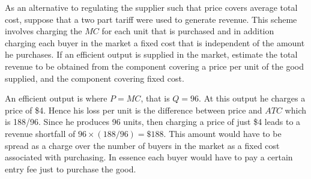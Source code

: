 \begin{enumialphparenastyle}
\begin{ex}\label{ex:ch14ex5}
As an alternative to regulating the supplier such that price covers average total cost, suppose that a two part tariff were used to generate revenue. This scheme involves charging the $MC$ for each unit that is purchased and in addition charging each buyer in the market a fixed cost that is independent of the amount he purchases. If an efficient output is supplied in the market, estimate the total revenue to be obtained from the component covering a price per unit of the good supplied, and the component covering fixed cost.
\begin{sol}
	An efficient output is where $P=MC$, that is $Q=96$. At this output he charges a price of \$4. Hence his loss per unit is the difference between price and $ATC$ which is 188/96. Since he produces 96 units, then charging a price of just \$4 leads to a revenue shortfall of $96\times (188/96)=\$188$. This amount would have to be spread as a charge over the number of buyers in the market as a fixed cost associated with purchasing. In essence each buyer would have to pay a certain entry fee just to purchase the good.
	
\end{sol}
\end{ex}


\end{enumialphparenastyle}